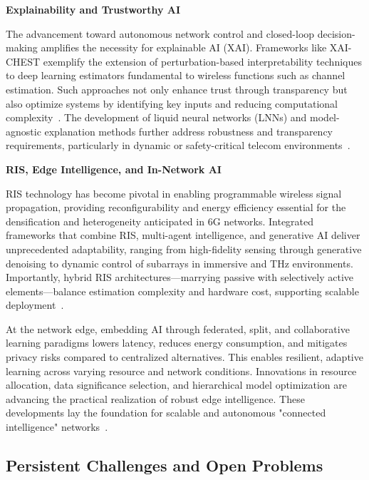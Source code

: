 \documentclass[sigconf]{acmart}
\begin{document}
\textbf{Explainability and Trustworthy AI}

The advancement toward autonomous network control and closed-loop decision-making amplifies the necessity for explainable AI (XAI). Frameworks like XAI-CHEST exemplify the extension of perturbation-based interpretability techniques to deep learning estimators fundamental to wireless functions such as channel estimation. Such approaches not only enhance trust through transparency but also optimize systems by identifying key inputs and reducing computational complexity~\cite{ref43, ref44, ref45, ref46, ref47, ref48, ref49}. The development of liquid neural networks (LNNs) and model-agnostic explanation methods further address robustness and transparency requirements, particularly in dynamic or safety-critical telecom environments~\cite{ref43}.

\textbf{RIS, Edge Intelligence, and In-Network AI}

RIS technology has become pivotal in enabling programmable wireless signal propagation, providing reconfigurability and energy efficiency essential for the densification and heterogeneity anticipated in 6G networks. Integrated frameworks that combine RIS, multi-agent intelligence, and generative AI deliver unprecedented adaptability, ranging from high-fidelity sensing through generative denoising to dynamic control of subarrays in immersive and THz environments. Importantly, hybrid RIS architectures—marrying passive with selectively active elements—balance estimation complexity and hardware cost, supporting scalable deployment~\cite{ref28, ref29, ref30, ref31, ref32, ref33, ref34}.

At the network edge, embedding AI through federated, split, and collaborative learning paradigms lowers latency, reduces energy consumption, and mitigates privacy risks compared to centralized alternatives. This enables resilient, adaptive learning across varying resource and network conditions. Innovations in resource allocation, data significance selection, and hierarchical model optimization are advancing the practical realization of robust edge intelligence. These developments lay the foundation for scalable and autonomous "connected intelligence" networks~\cite{ref35, ref36, ref37, ref38, ref39, ref40, ref41, ref42}.

\subsection{Persistent Challenges and Open Problems}
\end{document}
